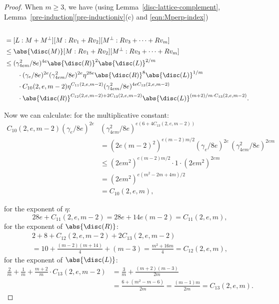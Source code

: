 \begin{proof}
When $m \geq 3$, we have (using Lemma~\ref{disc-lattice-complement}, Lemma~\ref{pre-induction}\eqref{pre-inductioniv}(c) and \eqref{eqn:Mperp-index})
\begin{align*}
[L : Rv_1 &+ \dotsb + Rv_m]
\\& = [L : M + M^\perp] [M : Rv_1 + Rv_2] [M^\perp : Rv_3 + \dotsb + Rv_m]
\\& \leq \abs{\disc(M)} [M : Rv_1 + Rv_2] [M^\perp : Rv_3 + \dotsb + Rv_m]
\\& \leq (\gamma_{4em}^2/8e)^{4e} \abs{\disc(R)}^2 \abs{\disc(L)}^{2/m}
\\& \qquad \cdot (\gamma_e/8e)^{2e} (\gamma_{4em}^2/8e)^{2e} \eta^{28e} \abs{\disc(R)}^8 \abs{\disc(L)}^{1/m}
\\& \qquad \cdot C_{10}(2,e,m-2) \eta^{C_{11}(2,e,m-2)} (\gamma_{4em}^2/8e)^{4eC_{13}(2,e,m-2)}
\\& \qquad \cdot \abs{\disc(R)}^{C_{12}(2,e,m-2) + 2C_{13}(2,e,m-2)} \abs{\disc(L)}^{(m+2)/m \cdot C_{13}(2,e,m-2)}.
\end{align*}

Now we can calculate:
for the multiplicative constant:
\begin{align*}
C_{10}(2,e,m-2) (\gamma_e/8e)^{2e}& (\gamma_{4em}^2/8e)^{e(6+4C_{13}(2,e,m-2))}
\\& = (2e(m-2)^2)^{e(m-2)m/2} (\gamma_e/8e)^{2e} \, (\gamma_{4em}^2/8e)^{2em}
\\& \leq (2em^2)^{e(m-2)m/2} \cdot 1 \cdot (2em^2)^{2em}
\\& = (2em^2)^{e(m^2-2m + 4m)/2}
\\& = C_{10}(2,e,m),
\end{align*}

for the exponent of $\eta$:
\[
28e + C_{11}(2,e,m-2) = 28e + 14e(m-2) = C_{11}(2,e,m),
\]
for the exponent of $\abs{\disc(R)}$:
\begin{multline*}
2 + 8 + C_{12}(2,e,m-2) + 2C_{13}(2,e,m-2)
\\
= 10 + \frac{(m-2)(m+14)}{4} + (m-3)
= \frac{m^2+16m}{4} = C_{12}(2,e,m),
\end{multline*}
for the exponent of $\abs{\disc(L)}$:
\begin{align*}
\frac{2}{m} + \frac{1}{m} + \frac{m+2}{m} \cdot C_{13}(2,e,m-2)
& = \frac{3}{m} + \frac{(m+2)(m-3)}{2m}
\\& = \frac{6+(m^2-m-6)}{2m} = \frac{(m-1)m}{2m} = C_{13}(2,e,m).
\end{align*}


\end{proof}
